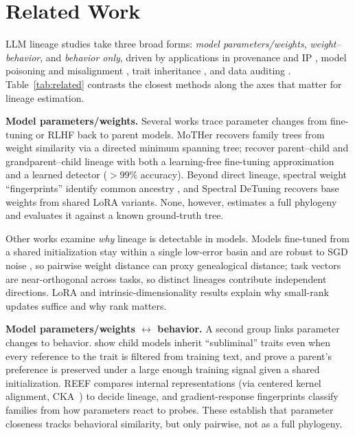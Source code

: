 \documentclass{article}
\theoremstyle{definition}
\theoremstyle{plain}
\begin{document}
\section{Related Work}
\label{sec:related}

LLM lineage studies take three broad forms: \emph{model parameters/weights}, \emph{weight--behavior},
and \emph{behavior only}, driven by applications in provenance and IP
\citep{horwitz2025mother, zeng2024huref, nikolic2026model}, model poisoning and misalignment
\citep{cloud2025subliminal}, trait inheritance \citep{cloud2025subliminal, agents2026same}, and data
auditing \citep{zhu2025independence}. Table~\ref{tab:related} contrasts the closest methods along the
axes that matter for lineage estimation.

\textbf{Model parameters/weights.} Several works trace parameter changes from fine-tuning or RLHF back to parent models. MoTHer
\citep{horwitz2025mother} recovers family trees from weight similarity via a directed minimum spanning
tree; \citet{yu2025neural} recover parent--child and grandparent--child lineage with both a
learning-free fine-tuning approximation and a learned detector ($>99\%$ accuracy). Beyond direct
lineage, spectral weight ``fingerprints'' identify common ancestry \citep{ghostspec2025}, and Spectral
DeTuning \citep{horwitz2024spectral} recovers base weights from shared LoRA variants. None, however,
estimates a full phylogeny and evaluates it against a known ground-truth tree.

Other works examine \emph{why} lineage is detectable in models. Models fine-tuned from a shared initialization stay
within a single low-error basin and are robust to SGD noise
\citep{neyshabur2020,wortsman2022model,frankle2020linear}, so pairwise weight distance can proxy
genealogical distance; task vectors \citep{ilharco2023editing} are near-orthogonal across tasks, so
distinct lineages contribute independent directions. LoRA \citep{hu2022lora} and intrinsic-dimensionality
results \citep{aghajanyan2021intrinsic} explain why small-rank updates suffice and why rank matters.

\textbf{Model parameters/weights $\leftrightarrow$ behavior.} A second group links parameter changes to
behavior. \citet{cloud2025subliminal} show child models inherit ``subliminal'' traits even when every
reference to the trait is filtered from training text, and prove a parent's preference is preserved
under a large enough training signal given a shared initialization. REEF \citep{zhang2025reef} compares
internal representations (via centered kernel alignment, CKA~\citep{kornblith2019similarity}) to decide lineage, and gradient-response fingerprints
\citep{tensorguard2025} classify families from how parameters react to probes. These establish that
parameter closeness tracks behavioral similarity, but only pairwise, not as a full phylogeny.
\end{document}
